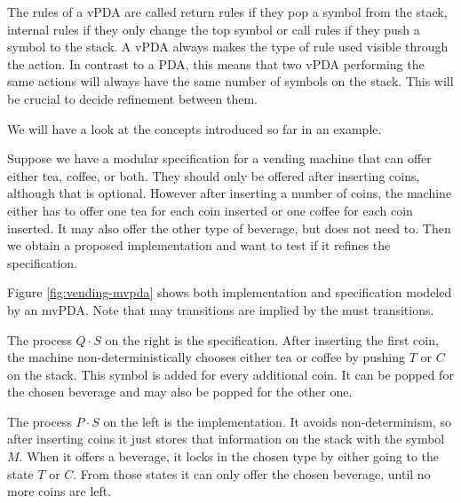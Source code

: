 The rules of a vPDA are called return rules if they pop a symbol
from the stack, internal rules if they only change the top symbol
or call rules if they push a symbol to the stack.
A vPDA always makes the type of rule used visible through the
action. In contrast to a PDA, this means that two vPDA
performing the same actions will always have the same number
of symbols on the stack. This will be crucial to decide
refinement between them.

We will have a look at the concepts introduced so far in an example.

\begin{example}
  Suppose we have a modular specification for a vending machine
  that can offer either tea, coffee, or both.
  They should only be offered after inserting coins, although that is optional.
  However after inserting a number of coins, the machine either has to offer
  one tea for each coin inserted or one coffee for each coin inserted.
  It may also offer the other type of beverage, but does not need to.
  Then we obtain a proposed implementation and want to test if it refines
  the specification.
  
  Figure \ref{fig:vending-mvpda} shows both implementation and specification modeled by
  an mvPDA. Note that may transitions are implied by the must transitions.

  The process $Q⋅S$ on the right is the specification. 
  After inserting the first coin, the machine
  non-deterministically chooses either tea or coffee by pushing $T$ or $C$
  on the stack. This symbol is added for every additional coin.
  It can be popped for the chosen beverage and may also be popped for the
  other one.
  
  The process $P⋅S$ on the left is the implementation.
  It avoids non-determinism, so after inserting
  coins it just stores that information on the stack with the symbol $M$.
  When it offers a beverage, it locks in the chosen type by either going to
  the state $T$ or $C$. From those states it can only offer the chosen beverage,
  until no more coins are left.
\end{example}

